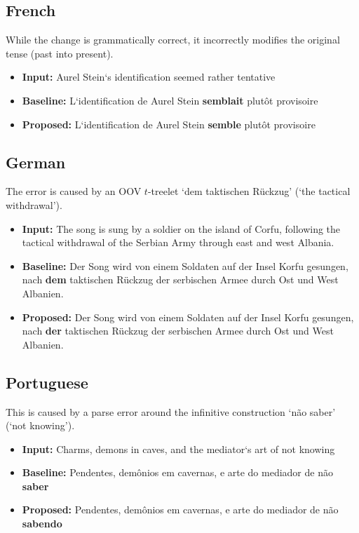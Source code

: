 \documentclass[english]{jnlp_1.4}
\begin{document}
\subsection{French}

While the change is grammatically correct, it incorrectly modifies the original tense (past into present).
\begin{itemize}
    \item \textbf{Input:} Aurel Stein`s identification seemed rather tentative
    \item \textbf{Baseline:} L`identification de Aurel Stein {\bf semblait} plut\^{o}t provisoire
    \item \textbf{Proposed:} L`identification de Aurel Stein {\bf semble} plut\^{o}t provisoire
\end{itemize}


\subsection{German}

The error is caused by an OOV $t$-treelet `dem taktischen R\"{u}ckzug' (`the tactical withdrawal').
\begin{itemize}
    \item \textbf{Input:} The song is sung by a soldier on the island of Corfu, following the tactical withdrawal of the Serbian Army through east and west Albania.
    \item \textbf{Baseline:} Der Song wird von einem Soldaten auf der Insel Korfu gesungen, nach {\bf dem} taktischen R\"{u}ckzug der serbischen Armee durch Ost und West Albanien.
    \item \textbf{Proposed:} Der Song wird von einem Soldaten auf der Insel Korfu gesungen, nach {\bf der} taktischen R\"{u}ckzug der serbischen Armee durch Ost und West Albanien.
\end{itemize}


\subsection{Portuguese}

This is caused by a parse error around the infinitive construction `n\~{a}o saber' (`not knowing').
\begin{itemize}
    \item \textbf{Input:} Charms, demons in caves, and the mediator`s art of not knowing
    \item \textbf{Baseline:} Pendentes, dem\^{o}nios em cavernas, e arte do mediador de n\~{a}o {\bf saber}
    \item \textbf{Proposed:} Pendentes, dem\^{o}nios em cavernas, e arte do mediador de n\~{a}o {\bf sabendo}
\end{itemize}
\end{document}
